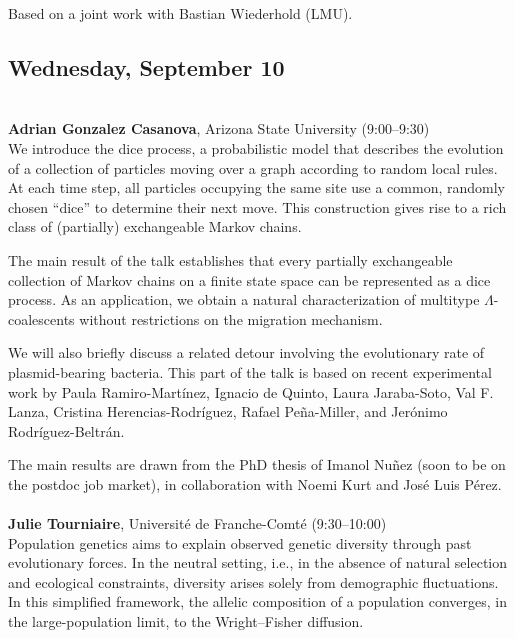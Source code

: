 \documentclass[12pt,a4paper]{article}
\begin{document}
 Based on a joint work with Bastian Wiederhold (LMU). \\
\bigskip\bigskip

\subsection*{\sffamily Wednesday, September 10}
\bigskip\bigskip
{}\\[1ex]{ \large \textbf{ Adrian Gonzalez Casanova}}, Arizona State University (9:00--9:30) \\[2ex] We introduce the dice process, a probabilistic model that describes the evolution of a collection of particles moving over a graph according to random local rules. At each time step, all particles occupying the same site use a common, randomly chosen “dice” to determine their next move. This construction gives rise to a rich class of (partially) exchangeable Markov chains. 

 The main result of the talk establishes that every partially exchangeable collection of Markov chains on a finite state space can be represented as a dice process. As an application, we obtain a natural characterization of multitype $\Lambda$-coalescents without restrictions on the migration mechanism. 

 We will also briefly discuss a related detour involving the evolutionary rate of plasmid-bearing bacteria. This part of the talk is based on recent experimental work by Paula Ramiro-Martínez, Ignacio de Quinto, Laura Jaraba-Soto, Val F. Lanza, Cristina Herencias-Rodríguez, Rafael Peña-Miller, and Jerónimo Rodríguez-Beltrán. 

 The main results are drawn from the PhD thesis of Imanol Nuñez (soon to be on the postdoc job market), in collaboration with Noemi Kurt and José Luis Pérez. \\
\\[1ex]{ \large \textbf{ Julie Tourniaire}}, Université de Franche-Comté (9:30--10:00) \\[2ex] Population genetics aims to explain observed genetic diversity through past evolutionary forces. In the neutral setting, i.e., in the absence of natural selection and ecological constraints, diversity arises solely from demographic fluctuations. In this simplified framework, the allelic composition of a population converges, in the large-population limit, to the Wright–Fisher diffusion. 
\end{document}
